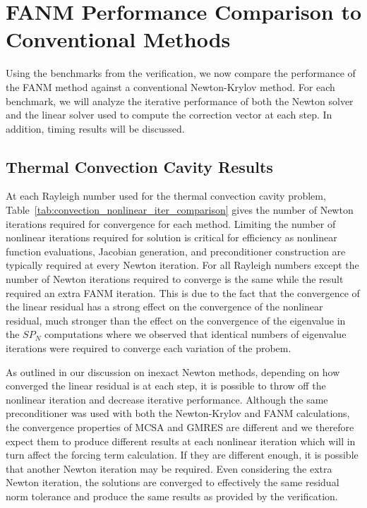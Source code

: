 \clearpage

\section{FANM Performance Comparison to Conventional Methods\ }
\label{sec:fanm_comparison}

Using the benchmarks from the verification, we now compare the
performance of the FANM method against a conventional Newton-Krylov
method. For each benchmark, we will analyze the iterative performance
of both the Newton solver and the linear solver used to compute the
correction vector at each step. In addition, timing results will be
discussed.

\subsection{Thermal Convection Cavity Results}
\label{subsec:thermal_convection_comparison}

At each Rayleigh number used for the thermal convection cavity
problem, Table~\ref{tab:convection_nonlinear_iter_comparison} gives
the number of Newton iterations required for convergence for each
method. Limiting the number of nonlinear iterations required for
solution is critical for efficiency as nonlinear function evaluations,
Jacobian generation, and preconditioner construction are typically
required at every Newton iteration. For all Rayleigh numbers except
 the number of Newton iterations required to converge is the
same while the  result required an extra FANM iteration. This
is due to the fact that the convergence of the linear residual has a
strong effect on the convergence of the nonlinear residual, much
stronger than the effect on the convergence of the eigenvalue in the
$SP_N$ computations where we observed that identical numbers of
eigenvalue iterations were required to converge each variation of the
probem.

As outlined in our discussion on inexact Newton methods, depending on
how converged the linear residual is at each step, it is possible to
throw off the nonlinear iteration and decrease iterative
performance. Although the same preconditioner was used with both the
Newton-Krylov and FANM calculations, the convergence properties of
MCSA and GMRES are different and we therefore expect them to produce
different results at each nonlinear iteration which will in turn
affect the forcing term calculation. If they are different enough, it
is possible that another Newton iteration may be required. Even
considering the extra Newton iteration, the solutions are converged to
effectively the same residual norm tolerance and produce the same
results as provided by the verification.

